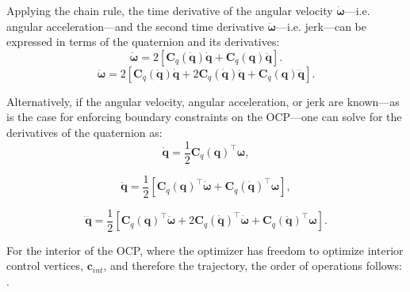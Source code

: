 Applying the chain rule, the time derivative of the angular velocity $\boldsymbol{\dot{\omega}}$---i.e. angular acceleration---and the second time derivative $\boldsymbol{\ddot{\omega}}$---i.e. jerk---can be expressed in terms of the quaternion and its derivatives: 
\begin{equation}
\dot{\boldsymbol{\omega}} = 
    2 \left[ \mathbf{C}_q(\dot{\mathbf{q}})\dot{\mathbf{q}} + \mathbf{C}_q(\mathbf{q})\ddot{\mathbf{q}} \right].
\label{eq:omega_dot_from_quat}
\end{equation}
\begin{equation}
    \ddot{\boldsymbol{\omega}} = 2 \left[ \mathbf{C}_q(\ddot{\mathbf{q}})\dot{\mathbf{q}} + 2\mathbf{C}_q(\dot{\mathbf{q}})\ddot{\mathbf{q}} + \mathbf{C}_q(\mathbf{q})\dddot{\mathbf{q}} \right].
    \label{eq:omega_ddot_from_quat}
\end{equation}

Alternatively, if the angular velocity, angular acceleration, or jerk are known---as is the case for enforcing boundary constraints on the \ac{OCP}---one can solve for the derivatives of the quaternion as:
\begin{equation}
    \dot{\mathbf{q}} = \frac{1}{2} \mathbf{C}_q(\mathbf{q})^\top \boldsymbol{\omega},
    \label{eq:q_dot_from_omega}
\end{equation}

\begin{equation}
    \ddot{\mathbf{q}} = \frac{1}{2} \left[ \mathbf{C}_q(\mathbf{q})^\top \dot{\boldsymbol{\omega}} + \mathbf{C}_q(\dot{\mathbf{q}})^\top \boldsymbol{\omega} \right],
    \label{eq:q_ddot_from_omega}
\end{equation}

\begin{equation}
    \dddot{\mathbf{q}} = \frac{1}{2} \left[ \mathbf{C}_q(\mathbf{q})^\top \ddot{\boldsymbol{\omega}} + 2 \mathbf{C}_q(\dot{\mathbf{q}})^\top \dot{\boldsymbol{\omega}} + \mathbf{C}_q(\ddot{\mathbf{q}})^\top \boldsymbol{\omega} \right].
    \label{eq:q_dddot_from_omega}
\end{equation}

For the interior of the \ac{OCP}, where the optimizer has freedom to optimize interior control vertices, $\mathbf{c}_{int}$, and therefore the trajectory, the order of operations follows:
.

